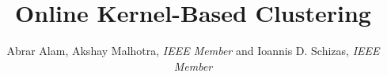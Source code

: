 \documentclass[10pt,final]{IEEEtran}
\begin{document}
%
\title{Online Kernel-Based Clustering}
%
%
%

\author{{Abrar Alam, Akshay Malhotra, \emph{IEEE Member} and Ioannis D. Schizas}, \emph{IEEE Member}}






%
%




%
\end{document}
